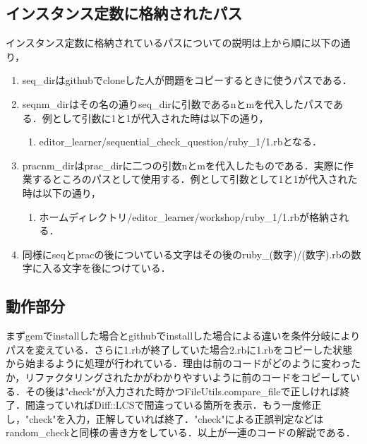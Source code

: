 \subsection{インスタンス定数に格納されたパス}\label{ux30a4ux30f3ux30b9ux30bfux30f3ux30b9ux5b9aux6570ux306bux683cux7d0dux3055ux308cux305fux30d1ux30b9}

インスタンス定数に格納されているパスについての説明は上から順に以下の通り，

\begin{enumerate}
\def\labelenumi{\arabic{enumi}.}
\tightlist
\item
  seq\_dirはgithubでcloneした人が問題をコピーするときに使うパスである．
\item
  seqnm\_dirはその名の通りseq\_dirに引数であるnとmを代入したパスである．例として引数に1と1が代入された時は以下の通り，

  \begin{enumerate}
  \def\labelenumii{\arabic{enumii}.}
  \tightlist
  \item
    editor\_learner/sequential\_check\_question/ruby\_1/1.rbとなる．
  \end{enumerate}
\item
  pracnm\_dirはprac\_dirに二つの引数nとmを代入したものである．実際に作業するところのパスとして使用する．例として引数として1と1が代入された時は以下の通り，

  \begin{enumerate}
  \def\labelenumii{\arabic{enumii}.}
  \tightlist
  \item
    ホームディレクトリ/editor\_learner/workshop/ruby\_1/1.rbが格納される．
  \end{enumerate}
\item
  同様にseqとpracの後についている文字はその後のruby\_(数字)/(数字).rbの数字に入る文字を後につけている．
\end{enumerate}

\subsection{動作部分}\label{ux52d5ux4f5cux90e8ux5206}

まずgemでinstallした場合とgithubでinstallした場合による違いを条件分岐によりパスを変えている．さらに1.rbが終了していた場合2.rbに1.rbをコピーした状態から始まるように処理が行われている．理由は前のコードがどのように変わったか，リファクタリングされたかがわかりやすいように前のコードをコピーしている．その後は"check"が入力された時かつFileUtils.compare\_fileで正しければ終了．間違っていればDiff::LCSで間違っている箇所を表示．もう一度修正し，"check"を入力，正解していれば終了．"check"による正誤判定などはrandom\_checkと同様の書き方をしている．以上が一連のコードの解説である．

